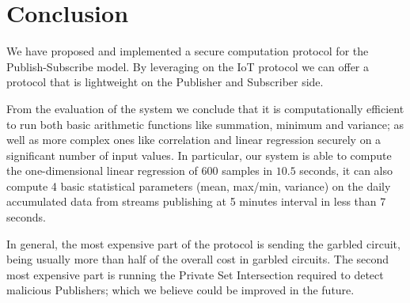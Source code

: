 \section{Conclusion}

We have proposed and implemented a secure computation protocol for the
Publish-Subscribe model.  By leveraging on the IoT \MQTT protocol we can offer
a protocol that is lightweight on the Publisher and Subscriber side.

From the evaluation of the system we conclude that it is computationally
efficient to run both basic arithmetic functions like summation, minimum and
variance; as well as more complex ones like correlation and linear regression
securely on a significant number of input values.
In particular, our system is able to compute the one-dimensional linear regression of 600
samples in $10.5$ seconds, it can also compute 4 basic statistical parameters
(mean, max/min, variance) on the daily accumulated data from streams publishing
at 5 minutes interval in less than 7 seconds.

In general, the most expensive part of the protocol is sending the garbled
circuit, being usually more than half of the overall cost in garbled circuits.
The second most expensive part is running the Private Set Intersection required
to detect malicious Publishers; which we believe could be improved in the future.

